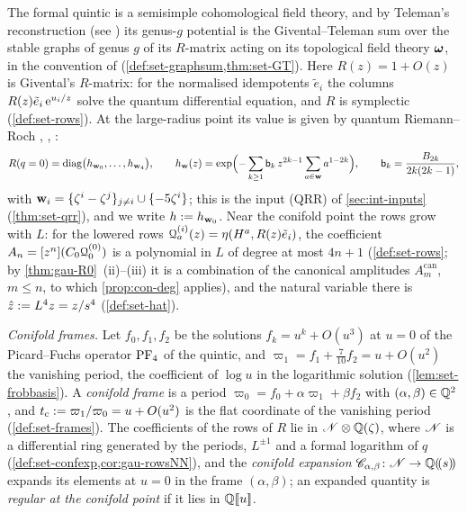 The formal quintic is a semisimple cohomological field theory, and by Teleman's reconstruction \cite[Theorem~(2) in (1.15)]{MR2917177} (see \cite[\S4.1, Theorem~4.1]{GJR18}) its genus-$g$ potential is the Givental--Teleman sum over the stable graphs of genus $g$ of its $R$-matrix acting on its topological field theory $\boldsymbol{\omega}$, in the convention of \cite[Defs.~2.2, 2.13]{PPZ15} (\cref{def:set-graphsum,thm:set-GT}). Here $R(z)=1+O(z)$ is Givental's $R$-matrix: for the normalised idempotents $\tilde e_i$ the columns $R(z)\tilde e_i\,\mathrm{e}^{u_i/z}$ solve the quantum differential equation, and $R$ is symplectic (\cref{def:set-rows}). At the large-radius point its value is given by quantum Riemann--Roch \cite[\S2.2, Theorem~1]{Giv01}, \cite[Corollary~1]{MR2276766}, \cite[(17)]{GJR18}:
\[
R(q=0)=\operatorname{diag}\bigl(h_{\mathbf{w}_0},\dots,h_{\mathbf{w}_4}\bigr),\qquad h_{\mathbf{w}}(z)=\exp\Bigl(-\sum_{k\geq1}\mathsf{b}_k\,z^{2k-1}\sum_{a\in\mathbf{w}}a^{1-2k}\Bigr),\qquad \mathsf{b}_k=\frac{B_{2k}}{2k(2k-1)},
\]
with $\mathbf{w}_i=\{\zeta^i-\zeta^j\}_{j\neq i}\cup\{-5\zeta^i\}$; this is the input (QRR) of \cref{sec:int-inputs} (\cref{thm:set-qrr}), and we write $h:=h_{\mathbf{w}_0}$. Near the conifold point the rows grow with $L$: for the lowered rows $\mathcal{Q}^{(i)}_a(z)=\eta(H^a,R(z)\tilde e_i)$, the coefficient $A_n=[z^n](C_0\mathcal{Q}^{(0)}_0)$ is a polynomial in $L$ of degree at most $4n+1$ (\cref{def:set-rows}; by \cref{thm:gau-R0}~(ii)--(iii) it is a combination of the canonical amplitudes $A^{\mathrm{can}}_m$, $m\leq n$, to which \cref{prop:con-deg} applies), and the natural variable there is $\hat{z}:=L^4z=z/s^4$ (\cref{def:set-hat}).

\emph{Conifold frames.} Let $f_0,f_1,f_2$ be the solutions $f_k=u^k+O(u^3)$ at $u=0$ of the Picard--Fuchs operator $\mathrm{PF}_{4}$ of the quintic, and $\varpi_1=f_1+\frac7{10}f_2=u+O(u^2)$ the vanishing period, the coefficient of $\log u$ in the logarithmic solution (\cref{lem:set-frobbasis}). A \emph{conifold frame} is a period $\varpi_0=f_0+\alpha\varpi_1+\beta f_2$ with $(\alpha,\beta)\in\mathbb{Q}^2$, and $t_{\mathrm{c}}:=\varpi_1/\varpi_0=u+O(u^2)$ is the flat coordinate of the vanishing period (\cref{def:set-frames}). The coefficients of the rows of $R$ lie in $\mathscr{N}\otimes\mathbb{Q}(\zeta)$, where $\mathscr{N}$ is a differential ring generated by the periods, $L^{\pm1}$ and a formal logarithm of $q$ (\cref{def:set-confexp,cor:gau-rowsNN}), and the \emph{conifold expansion} $\mathscr{C}_{\alpha,\beta}\colon\mathscr{N}\to\mathbb{Q}(\!(s)\!)$ expands its elements at $u=0$ in the frame $(\alpha,\beta)$; an expanded quantity is \emph{regular at the conifold point} if it lies in $\mathbb{Q}[\![ u ]\!]$.

